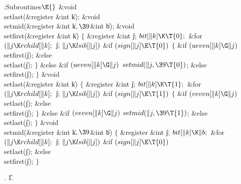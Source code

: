 \Y\B\4:Subroutines\X${}\E{}$\6
\&{void} \\{setlast}(\&{register} \&{int} \|k);\6
\&{void} \\{setmid}(\&{register} \&{int} \|k${},\39{}$\&{int} \|b);\7
\&{void} \\{setfirst}(\&{register} \&{int} \|k)\1\1\2\2\6
${}\{{}$\1\6
\&{register} \&{int} \|j;\7
${}\\{bit}[\|k]\K\T{0};{}$\6
\&{for} ${}(\|j\K\\{rchild}[\|k];{}$ \|j; ${}\|j\K\\{lsib}[\|j]){}$\1\6
\&{if} ${}(\\{sign}[\|j]\E\T{0}){}$\5
${}\{{}$\1\6
\&{if} ${}(\\{ueven}[\|k]\G\|j){}$\1\5
\\{setfirst}(\|j);\2\6
\&{else}\1\5
\\{setlast}(\|j);\2\6
\4${}\}{}$\5
\2\&{else} \&{if} ${}(\\{ueven}[\|k]\G\|j){}$\1\5
${}\\{setmid}(\|j,\39\T{0}){}$;\2\6
\&{else}\1\5
\\{setfirst}(\|j);\2\2\6
\4${}\}{}$\2\7
\&{void} \\{setlast}(\&{register} \&{int} \|k)\1\1\2\2\6
${}\{{}$\1\6
\&{register} \&{int} \|j;\7
${}\\{bit}[\|k]\K\T{1};{}$\6
\&{for} ${}(\|j\K\\{rchild}[\|k];{}$ \|j; ${}\|j\K\\{lsib}[\|j]){}$\1\6
\&{if} ${}(\\{sign}[\|j]\E\T{1}){}$\5
${}\{{}$\1\6
\&{if} ${}(\\{veven}[\|k]\G\|j){}$\1\5
\\{setlast}(\|j);\2\6
\&{else}\1\5
\\{setfirst}(\|j);\2\6
\4${}\}{}$\5
\2\&{else} \&{if} ${}(\\{veven}[\|k]\G\|j){}$\1\5
${}\\{setmid}(\|j,\39\T{1}){}$;\2\6
\&{else}\1\5
\\{setlast}(\|j);\2\2\6
\4${}\}{}$\2\7
\&{void} \\{setmid}(\&{register} \&{int} \|k${},\39{}$\&{int} \|b)\1\1\2\2\6
${}\{{}$\1\6
\&{register} \&{int} \|j;\7
${}\\{bit}[\|k]\K\|b;{}$\6
\&{for} ${}(\|j\K\\{rchild}[\|k];{}$ \|j; ${}\|j\K\\{lsib}[\|j]){}$\1\6
\&{if} ${}(\\{sign}[\|j]\E\T{0}){}$\1\5
\\{setlast}(\|j);\5
\2\&{else}\1\5
\\{setfirst}(\|j);\2\2\6
\4${}\}{}$\2\par
{}.
\U1.\fi

